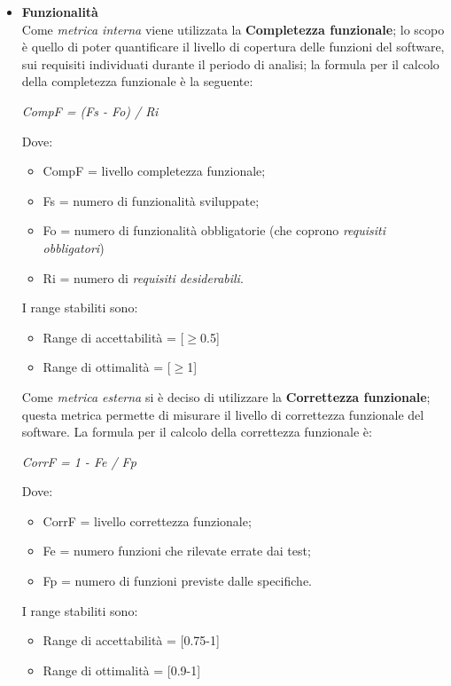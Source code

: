    \begin{itemize}
      \item \textbf{Funzionalità}\\
      Come \emph{metrica interna} viene utilizzata la \textbf{Completezza funzionale};
      lo scopo è quello di poter quantificare il livello di copertura delle funzioni del software, sui requisiti individuati durante il periodo di analisi;
      la formula per il calcolo della completezza funzionale è la seguente:
      \begin{center}
        \emph{CompF = (Fs - Fo) / Ri}
      \end{center}
      Dove:
      \begin{itemize}
        \item CompF = livello completezza funzionale;
        \item Fs = numero di funzionalità sviluppate;
        \item Fo = numero di funzionalità obbligatorie (che coprono \emph{requisiti obbligatori})
        \item Ri = numero di \emph{requisiti desiderabili}.
      \end{itemize}
      I range stabiliti sono:
      \begin{itemize}
        \item Range di accettabilità = [\(\geq\)0.5]
        \item Range di ottimalità = [\(\geq\)1]
      \end{itemize}
      Come \emph{metrica esterna} si è deciso di utilizzare la \textbf{Correttezza funzionale};
      questa metrica permette di misurare il livello di correttezza funzionale del software.
      La formula per il calcolo della correttezza funzionale è:
      \begin{center}
        \emph{CorrF = 1 - Fe / Fp}
      \end{center}
      Dove:
      \begin{itemize}
        \item CorrF = livello correttezza funzionale;
        \item Fe = numero funzioni che rilevate errate dai test;
        \item Fp = numero di funzioni previste dalle specifiche.
      \end{itemize}
      I range stabiliti sono:
      \begin{itemize}
        \item Range di accettabilità = [0.75-1]
        \item Range di ottimalità = [0.9-1]

\end{itemize}
\end{itemize}
